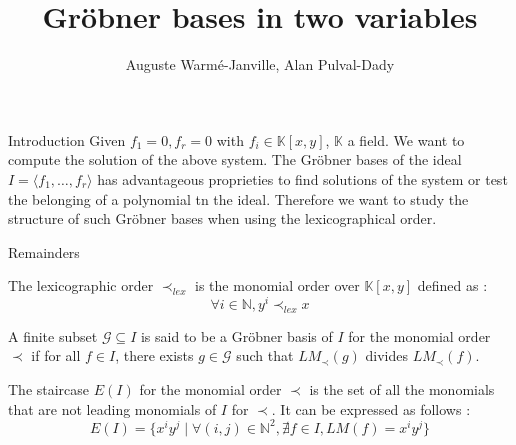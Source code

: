 \documentclass{beamer}
\title{Gröbner bases in two variables}
\author{Auguste Warmé-Janville, Alan Pulval-Dady}
\institute{Sorbonne Université}
\begin{document}
\frame{\titlepage}



\begin{frame}{Introduction}
    Given $f_1 = 0, f_r = 0$ with $f_i \in \mathbb{K}[x,y]$, $\mathbb{K}$ a field.
    We want to compute the solution of the above system.
    The Gröbner bases of the ideal $I = \langle f_1,\dots,f_r \rangle$ has advantageous proprieties to find solutions of the system or test the belonging of a polynomial tn the ideal.
    Therefore we want to study the structure of such Gröbner bases when using the lexicographical order.
\end{frame}

\begin{frame}{Remainders}
    \begin{definition}\label{def:lexicographic-order}
        The lexicographic order $\prec_{lex}$ is the monomial order over $\mathbb{K}[x, y]$ defined as : 
        \begin{displaymath}
            \forall i \in \mathbb{N}, y^{i} \prec_{lex} x
        \end{displaymath}
    \end{definition}
    \begin{definition}
        A finite subset $\mathscr{G} \subseteq I$ is said to be a Gröbner basis of $I$ for the monomial order $\prec$ if for all $f \in I$, there exists $g \in \mathscr{G}$ such that $LM_{\prec}(g)$ divides $LM_{\prec}(f)$. 
    \end{definition}
    \begin{definition}[Staircase]
        The staircase $E(I)$ for the monomial order $\prec$ is the set of all the monomials that are not leading monomials of $I$ for $\prec$. It can be expressed as follows : 
        \begin{displaymath}
            E(I) = \{ x^{i}y^{j} \mid \forall (i, j) \in \mathbb{N}^{2}, \nexists f \in I, LM(f) = x^{i}y^{j}\}
        \end{displaymath}
    \end{definition}
\end{frame}
\end{document}
